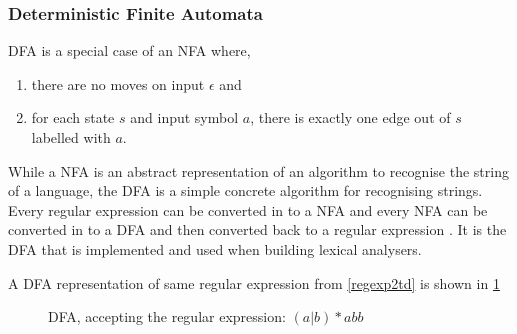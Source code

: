 \subsubsection{Deterministic Finite Automata}
DFA is a special case of an NFA where,
\begin{enumerate}
  \item there are no moves on input $\epsilon$ and
  \item for each state $s$ and input symbol $a$, there is exactly one edge out
        of $s$ labelled with $a$.
\end{enumerate}
While a NFA is an abstract representation of an algorithm to recognise the string 
of a language, the DFA is a simple concrete algorithm for recognising strings. 
Every regular expression can be converted in to a NFA and every NFA can be 
converted in to a DFA and then converted back to a regular expression \cite{Aho2006}. 
It is the DFA that is implemented and 
used when building lexical analysers. 
\begin{example} \label{regexp2dfa}
A DFA representation of same regular expression from \cref{regexp2td} is shown in \cref{fig:dfa}
\end{example}
\begin{figure}[!h]
  \centering
  \caption{DFA, accepting the regular expression: $(a | b)* abb$
  \label{fig:dfa}}
\end{figure}

 

